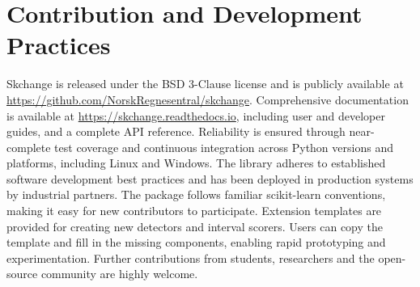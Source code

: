 \documentclass[twoside,11pt]{article}
\begin{document}
\section{Contribution and Development Practices}
\label{sec:contributions}
Skchange is released under the BSD 3-Clause license and is publicly available at \url{https://github.com/NorskRegnesentral/skchange}.
Comprehensive documentation is available at \href{https://skchange.readthedocs.io}{\url{https://skchange.readthedocs.io}}, including user and developer guides, and a complete API reference.
Reliability is ensured through near-complete test coverage and continuous integration across Python versions and platforms, including Linux and Windows.
The library adheres to established software development best practices and has been deployed in production systems by industrial partners.
The package follows familiar scikit-learn conventions, making it easy for new contributors to participate.
Extension templates are provided for creating new detectors and interval scorers. Users can copy the template and fill in the missing components, enabling rapid prototyping and experimentation.
Further contributions from students, researchers and the open-source community are highly welcome.


\end{document}

